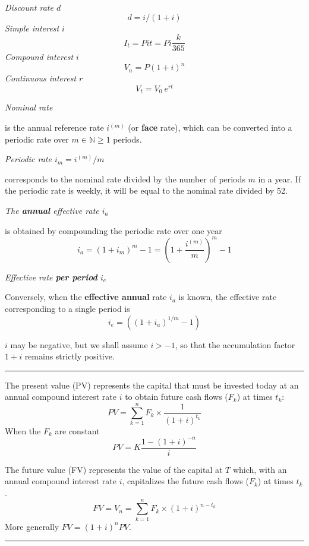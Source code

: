 \begin{f}[Interests]

\emph{Discount rate \(d\)}
     \[d=i/(1+i)\]
\emph{Simple interest \(i\)}
\[
I_t=P i t=P i \frac{k}{365}
\]
\emph{Compound interest \(i\)}
\[
V_n=P(1+i)^n%
\]
\emph{Continuous interest \(r\)}
\[V_t=V_0\ e^{rt}\]

\emph{Nominal rate}

is the annual reference rate \(i^{(m)}\) (or \textbf{face} rate), which can be converted into a periodic rate over \(m\in \mathbb{N} \geq 1\) periods.
\smallskip

\emph{Periodic rate \(i_m=i^{(m)}/m\)}

corresponds to the nominal rate divided by the number of periods \(m\) in a year.
If the periodic rate is weekly, it will be equal to the nominal rate divided by 52.
\smallskip

\emph{The \textbf{annual} effective rate \(i_a\)}

is obtained by compounding the periodic rate over one year
\[
i_a=\left( 1+i_m\right)^{m}-1=\left( 1+\frac{i^{(m)}}{m}\right)^{m}-1
\]

\emph{Effective rate \textbf{per period} \(i_e\)}

Conversely, when the \textbf{effective annual} rate \(i_a\) is known, the effective rate corresponding to a single period is 
\[
i_e=\left( (1+i_a)^{1 / m}-1\right) 
\]

\(i\) may be negative, but we shall assume \(i>-1\), so that the accumulation factor \(1+i\) remains strictly positive.
\end{f}
\hrule

\begin{f}

The present value (PV) represents the capital that must be invested today at an annual compound interest rate \(i\) to obtain future cash flows (\(F_k\)) at times \(t_k\):
\begin{equation}
	PV = \sum_{k=1}^{n} F_k \times \frac{1}{(1+i)^{t_k}}
\label{ValeurActuelle}
\end{equation}
When the \(F_k\) are constant
\begin{equation}
	PV = K  \frac{1 - (1+i)^{-n}} {i}
\label{ValeurActuelleFluxCt}
\end{equation}

The future value (FV) represents the value of the capital at \(T\) which, with an annual compound interest rate \(i\), capitalizes the future cash flows (\(F_k\)) at times \(t_k\).
\begin{equation}
	FV=V_n = \sum_{k=1}^{n} F_k \times (1+i)^{n-t_k}
\end{equation}
More generally \(FV= (1+i)^{n}PV\).
\end{f}
\hrule


